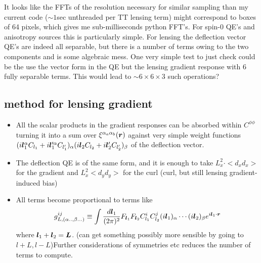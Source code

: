 \documentclass[11pt]{article}
\begin{document}
It looks like the FFTs of the resolution necessary for similar sampling than my current code ($\sim 1 $sec unthreaded per TT lensing term) might correspond to boxes of 64 pixels, which gives me sub-milliseconds python FFT's. 
For spin-0 QE's and anisotropy sources this is particularly simple. For lensing the deflection vector QE's are indeed all separable, but there is a number of terms owing to the two components and is some algebraic mess. One very simple test to just check could be the use the vector form in the QE but the lensing gradient response with 6 fully separable terms. This would lead to $\sim 6 \times 6 \times 3$ such operations?

\subsection{method for lensing gradient}
\begin{itemize}
\item All the scalar products in the gradient responses can be absorbed within $C^{\phi \phi}$ turning it into a sum over $\xi^{\alpha_a \alpha_b}(\boldsymbol{r})$ against very simple weight functions $(i \boldsymbol{l}^\alpha _1 C_{l_1} +i \boldsymbol{l}'^\alpha _1 C_{l'_1} )_\alpha(i \boldsymbol{l}_2 C_{l_2} +i \boldsymbol{l}'_2 C_{l'_2} )_\beta$ of the deflection vector.
\item The deflection QE is of the same form, and it is enough to take $L_x^2\cdot <d_x d_x>$ for the gradient and $L_x^2<d_yd_y>$ for the curl (curl, but still lensing gradient-induced bias)
\item All terms become proportional to terms like
\begin{equation}
	g^{ij}_{L,(\alpha.. , \beta...)} \equiv \int \frac{d\boldsymbol{l}_1}{(2\pi)^2} F_{\boldsymbol{l}_1}F_{\boldsymbol{l}_2} C_{l_1}^{i}C_{l_2}^{j}(i \boldsymbol{l}_1)_{\alpha} \cdots(i \boldsymbol{l}_2)_{\beta} e^{i \boldsymbol{l}_1 \cdot \boldsymbol{r}} 
\end{equation}
where $\boldsymbol{l}_1 + \boldsymbol{l}_2 = \boldsymbol{L}$. (can get something possibly more sensible by going to $l+L,l-L$)Further considerations of symmetries etc reduces the number of terms to compute.
\end{itemize}
\end{document}
